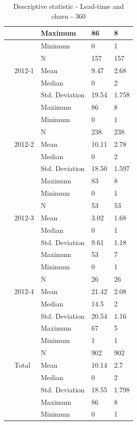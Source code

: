 \documentclass[UKenglish]{ifimaster}  %
\begin{document}
\begin{table}[!htbp]
\begin{adjustwidth}{-1cm}{}
{\begin{tabular}{ | l | l | l | l | l | }
	 &  & Maximum & 86 & 8 \\ \hline
	 &  & Minimum & 0 & 1 \\ \hline
	 &  & N & 157 & 157 \\ \hline
	 & 2012-1 & Mean & 9.47 & 2.68 \\ \hline
	 &  & Median & 0 & 2 \\ \hline
	 &  & Std. Deviation & 19.54 & 1.758 \\ \hline
	 &  & Maximum & 86 & 8 \\ \hline
	 &  & Minimum & 0 & 1 \\ \hline
	 &  & N & 238 & 238 \\ \hline
	 & 2012-2 & Mean & 10.11 & 2.78 \\ \hline
	 &  & Median & 0 & 2 \\ \hline
	 &  & Std. Deviation & 18.50 & 1.597 \\ \hline
	 &  & Maximum & 83 & 8 \\ \hline
	 &  & Minimum & 0 & 1 \\ \hline
	 &  & N & 53 & 53 \\ \hline
	 & 2012-3 & Mean & 3.02 & 1.68 \\ \hline
	 &  & Median & 0 & 1 \\ \hline
	 &  & Std. Deviation & 9.61 & 1.18\\ \hline
	 &  & Maximum & 53 & 7 \\ \hline
	 &  & Minimum & 0 & 1 \\ \hline
	 &  & N & 26 & 26 \\ \hline
	 & 2012-4 & Mean & 21.42 & 2.08 \\ \hline
	 &  & Median & 14.5 & 2 \\ \hline
	 &  & Std. Deviation & 20.54 & 1.16 \\ \hline
	 &  & Maximum & 67 & 5 \\ \hline
	 &  & Minimum & 1 & 1 \\ \hline
	 &  & N & 902 & 902 \\ \hline
	 & Total & Mean & 10.14 & 2.7 \\ \hline
	 &  & Median & 0 & 2 \\ \hline
	 &  & Std. Deviation & 18.55 & 1.798 \\ \hline
	 &  & Maximum & 86 & 8 \\ \hline
	 &  & Minimum & 0 & 1 \\ \hline
\end{tabular}
}
\caption{Descriptive statistic  - Lead-time and churn - 360}
\end{adjustwidth}
 \end{table}%
 
\end{document}
